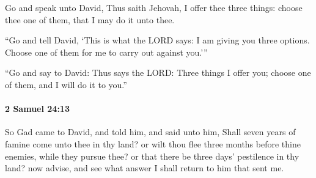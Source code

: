 			\begin{versebox}
					\item[BHS] 
					\item[ASV] Go and speak unto David, Thus saith Jehovah, I offer thee three things: choose thee one of them, that I may do it unto thee.
					\item[NIV] “Go and tell David, ‘This is what the LORD says: I am giving you three options. Choose one of them for me to carry out against you.’”
					\item[NRSV] “Go and say to David: Thus says the LORD: Three things I offer you; choose one of them, and I will do it to you.”
			\end{versebox}

		\paragraph{2 Samuel 24:13} %
			\label{2SAMUEL-24-13}

			So Gad came to David, and told him, and said unto him, Shall seven years of famine come unto thee in thy land? or wilt thou flee three months before thine enemies, while they pursue thee? or that there be three days’ pestilence in thy land? now advise, and see what answer I shall return to him that sent me.

